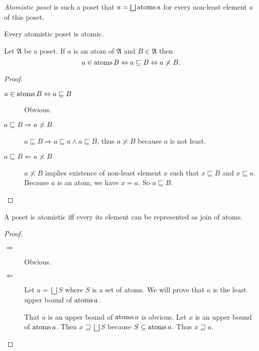 \begin{defn}
\emph{Atomistic poset} is such a poset that $a=\bigsqcup\atoms a$
for every non-least element $a$ of this poset.\end{defn}
\begin{obvious}
Every atomistic poset is atomic.\end{obvious}
\begin{prop}
Let $\mathfrak{A}$ be a poset. If $a$ is an atom of $\mathfrak{A}$
and $B\in\mathfrak{A}$ then 
\[
a\in\operatorname{atoms} B\Leftrightarrow a\sqsubseteq B\Leftrightarrow a\not\asymp B.
\]
\end{prop}
\begin{proof}
~
\begin{description}
\item [{$a\in\operatorname{atoms} B\Leftrightarrow a\sqsubseteq B$}] Obvious.
\item [{$a\sqsubseteq B\Rightarrow a\nasymp B$}] $a\sqsubseteq B\Rightarrow a\sqsubseteq a\land a\sqsubseteq B$,
thus $a\nasymp B$ because $a$ is not least.
\item [{$a\sqsubseteq B\Leftarrow a\nasymp B$}] $a\nasymp B$ implies
existence of non-least element $x$ such that $x\sqsubseteq B$ and
$x\sqsubseteq a$. Because $a$ is an atom, we have $x=a$. So $a\sqsubseteq B$.
\end{description}
\end{proof}
\begin{thm}
A poset is atomistic iff every its element can be represented as join of atoms.
\end{thm}
\begin{proof}
~
\begin{description}
\item[$\Rightarrow$] Obvious.
\item[$\Leftarrow$] Let $a = \bigsqcup S$ where $S$ is a set of atoms. We will prove that $a$ is
the least upper bound of $\operatorname{atoms} a$.

That $a$ is an upper bound of $\operatorname{atoms} a$ is obvious. Let $x$ is an upper
bound of $\operatorname{atoms} a$. Then $x \sqsupseteq \bigsqcup S$ because $S\subseteq \operatorname{atoms} a$. Thus $x \sqsupseteq a$.
\end{description}

\end{proof}

